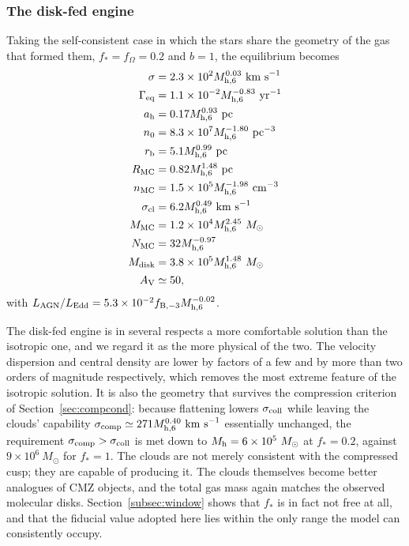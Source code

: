 \documentclass[preprint2]{aastex}
\newcommand{\msun}{M_{\odot}\xspace}
\newcommand{\mhsix}{M_{\rm h,6}\xspace}
\begin{document}
\subsubsection{The disk-fed engine}

Taking the self-consistent case in which the stars share the geometry of the gas that formed them, $f_{\ast} = f_{\Omega} = 0.2$ and $b = 1$, the equilibrium becomes
\begin{align}
\sigma &= 2.3 \times 10^{2} \mhsix^{0.03}~{\rm km~s}^{-1}\\
\Gamma_{\rm eq} &= 1.1 \times 10^{-2} \mhsix^{-0.83}~{\rm yr}^{-1}\\
a_{\rm h} &= 0.17 \mhsix^{0.93}~{\rm pc}\\
n_{0} &= 8.3 \times 10^{7} \mhsix^{-1.80}~{\rm pc}^{-3}\\
r_{\rm b} &= 5.1 \mhsix^{0.99}~{\rm pc}\\
R_{\rm MC} &= 0.82 \mhsix^{1.48}~{\rm pc}\\
n_{\rm MC} &= 1.5 \times 10^{5} \mhsix^{-1.98}~{\rm cm}^{-3}\\
\sigma_{\rm cl} &= 6.2 \mhsix^{0.49}~{\rm km~s}^{-1}\\
M_{\rm MC} &= 1.2 \times 10^{4} \mhsix^{2.45}~\msun\\
N_{\rm MC} &= 32 \mhsix^{-0.97}\\
M_{\rm disk} &= 3.8 \times 10^{5} \mhsix^{1.48}~\msun\\
A_{\rm V} &\simeq 50,
\end{align}
with $L_{\rm AGN}/L_{\rm Edd} = 5.3 \times 10^{-2} f_{\rm B,-3} \mhsix^{-0.02}$.

The disk-fed engine is in several respects a more comfortable solution than the isotropic one, and we regard it as the more physical of the two. The velocity dispersion and central density are lower by factors of a few and by more than two orders of magnitude respectively, which removes the most extreme feature of the isotropic solution. It is also the geometry that survives the compression criterion of Section~\ref{sec:compcond}: because flattening lowers $\sigma_{\rm coll}$ while leaving the clouds' capability $\sigma_{\rm comp} \simeq 271 \mhsix^{0.40}~{\rm km~s}^{-1}$ essentially unchanged, the requirement $\sigma_{\rm comp} > \sigma_{\rm coll}$ is met down to $M_{\rm h} = 6 \times 10^{5}~\msun$ at $f_{\ast} = 0.2$, against $9 \times 10^{6}~\msun$ for $f_{\ast} = 1$. The clouds are not merely consistent with the compressed cusp; they are capable of producing it. The clouds themselves become better analogues of CMZ objects, and the total gas mass again matches the observed molecular disks. Section~\ref{subsec:window} shows that $f_{\ast}$ is in fact not free at all, and that the fiducial value adopted here lies within the only range the model can consistently occupy.
\end{document}
